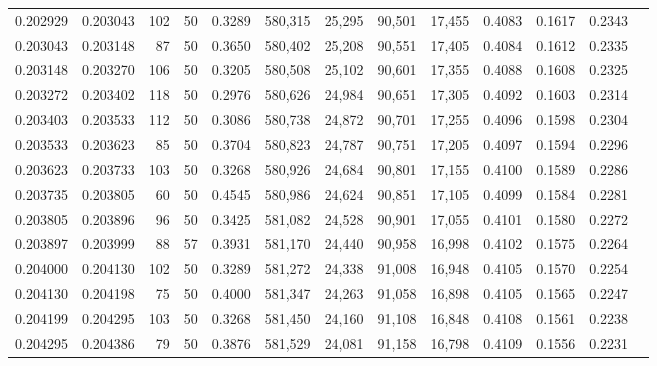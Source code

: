 \begin{tabular}{rrrrrrrrrrrrr}
0.202929 & 0.203043 &   102 &  50 &                                     0.3289 & 580,315 &  25,295 &  90,501 &  17,455 & 0.4083 & 0.1617 & 0.2343 \\
0.203043 & 0.203148 &    87 &  50 &                                     0.3650 & 580,402 &  25,208 &  90,551 &  17,405 & 0.4084 & 0.1612 & 0.2335 \\
0.203148 & 0.203270 &   106 &  50 &                                     0.3205 & 580,508 &  25,102 &  90,601 &  17,355 & 0.4088 & 0.1608 & 0.2325 \\
0.203272 & 0.203402 &   118 &  50 &                                     0.2976 & 580,626 &  24,984 &  90,651 &  17,305 & 0.4092 & 0.1603 & 0.2314 \\
0.203403 & 0.203533 &   112 &  50 &                                     0.3086 & 580,738 &  24,872 &  90,701 &  17,255 & 0.4096 & 0.1598 & 0.2304 \\
0.203533 & 0.203623 &    85 &  50 &                                     0.3704 & 580,823 &  24,787 &  90,751 &  17,205 & 0.4097 & 0.1594 & 0.2296 \\
0.203623 & 0.203733 &   103 &  50 &                                     0.3268 & 580,926 &  24,684 &  90,801 &  17,155 & 0.4100 & 0.1589 & 0.2286 \\
0.203735 & 0.203805 &    60 &  50 &                                     0.4545 & 580,986 &  24,624 &  90,851 &  17,105 & 0.4099 & 0.1584 & 0.2281 \\
0.203805 & 0.203896 &    96 &  50 &                                     0.3425 & 581,082 &  24,528 &  90,901 &  17,055 & 0.4101 & 0.1580 & 0.2272 \\
0.203897 & 0.203999 &    88 &  57 &                                     0.3931 & 581,170 &  24,440 &  90,958 &  16,998 & 0.4102 & 0.1575 & 0.2264 \\
0.204000 & 0.204130 &   102 &  50 &                                     0.3289 & 581,272 &  24,338 &  91,008 &  16,948 & 0.4105 & 0.1570 & 0.2254 \\
0.204130 & 0.204198 &    75 &  50 &                                     0.4000 & 581,347 &  24,263 &  91,058 &  16,898 & 0.4105 & 0.1565 & 0.2247 \\
0.204199 & 0.204295 &   103 &  50 &                                     0.3268 & 581,450 &  24,160 &  91,108 &  16,848 & 0.4108 & 0.1561 & 0.2238 \\
0.204295 & 0.204386 &    79 &  50 &                                     0.3876 & 581,529 &  24,081 &  91,158 &  16,798 & 0.4109 & 0.1556 & 0.2231 \\

\end{tabular}
